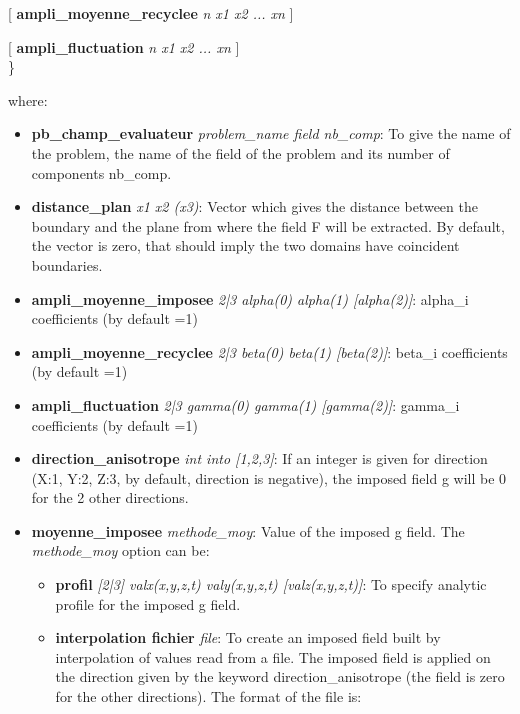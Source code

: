 \hspace{0.8cm} [ \textbf{ampli\_moyenne\_recyclee} \textit{n x1 x2 ... xn} ]
%

\hspace{0.8cm} [ \textbf{ampli\_fluctuation} \textit{n x1 x2 ... xn} ] \\
%
\}






where:

\begin{itemize}

\item \textbf{pb\_champ\_evaluateur} \textit{problem\_name field nb\_comp}: To give the name of the problem, the name of the field of the problem and its number of components nb\_comp.
%
\item \textbf{distance\_plan} \textit{x1 x2 (x3)}: Vector which gives the distance between the boundary and the plane from where the field F will be extracted. By default, the vector is zero, that should imply the two domains have coincident boundaries.
%
\item \textbf{ampli\_moyenne\_imposee} \textit{2|3 alpha(0) alpha(1) [alpha(2)]}: alpha\_i coefficients (by default =1)
%
\item \textbf{ampli\_moyenne\_recyclee} \textit{2|3 beta(0) beta(1) [beta(2)]}: beta\_i coefficients (by default =1)
%
\item \textbf{ampli\_fluctuation} \textit{2|3 gamma(0) gamma(1) [gamma(2)]}: gamma\_i coefficients (by default =1)
%
\item \textbf{direction\_anisotrope} \textit{int into [1,2,3]}: If an integer is given for direction (X:1, Y:2, Z:3, by default, direction is negative), the imposed field g will be 0 for the 2 other directions.
%
\item \textbf{moyenne\_imposee} \textit{methode\_moy}: Value of the imposed g field. The \textit{methode\_moy} option can be:
%
\begin{itemize}
\item[] \textbf{profil} \textit{[2|3] valx(x,y,z,t) valy(x,y,z,t) [valz(x,y,z,t)]}: To specify analytic profile for the imposed g field. 
%
\item[] \textbf{interpolation fichier} \textit{file}: To create an imposed field built by interpolation of values read from a file. The imposed field is applied on the direction given by the keyword direction\_anisotrope (the field is zero for the other directions). The format of the file is: 
%
\begin{center}

\end{center}
\end{itemize}
\end{itemize}
